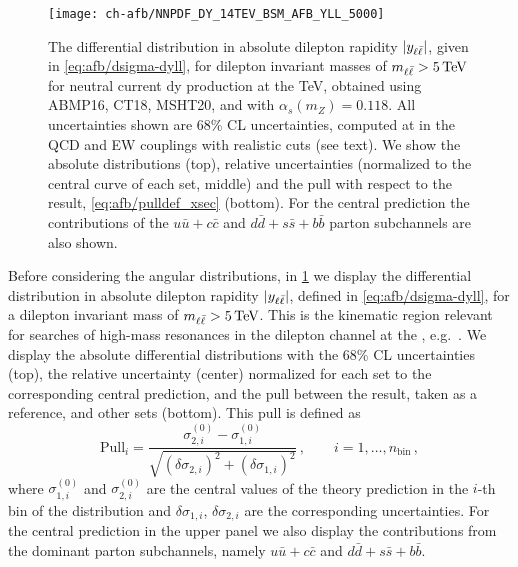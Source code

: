 \begin{figure}[!t]
 \centering
 \texttt{[image: ch-afb/NNPDF\_DY\_14TEV\_BSM\_AFB\_YLL\_5000]}
 \caption{The differential distribution in absolute dilepton rapidity $|y_{\ell\bar{\ell}}|$, given in
\cref{eq:afb/dsigma-dyll},
for dilepton invariant masses of $\mll > \SI{5}{\tera\electronvolt}$
for neutral current \acrlong{dy} production at the
 TeV,
obtained using ABMP16, CT18, MSHT20, and  \nnlo \pdfs with $\alpha_s(m_Z)=0.118$.
%
All
uncertainties shown are 68\% CL \pdf uncertainties, computed at \nlo
in the QCD and EW couplings with realistic cuts (see text).
We show the absolute distributions (top), relative uncertainties (normalized
to the central curve of each set, middle) and the pull with respect to the
 result, \cref{eq:afb/pulldef_xsec} (bottom).
%
For the central  prediction
the contributions of the $u\bar{u}+c\bar{c}$ and $d\bar{d}+s\bar{s}+b\bar{b}$
parton subchannels are also shown.
 \label{fig:afb/CMS_DY_14TEV_MLL_5000_rap}}
\end{figure}

Before considering the angular distributions, in
\cref{fig:afb/CMS_DY_14TEV_MLL_5000_rap} we display the 
differential distribution in absolute dilepton rapidity $|y_{\ell\bar{\ell}}|$,
defined in \cref{eq:afb/dsigma-dyll},
for a dilepton invariant mass of $\mll > \SI{5}{\tera\electronvolt}$.
%
This is the kinematic region relevant for searches of high-mass resonances
in the dilepton channel at the \lhc, e.g.~\cite{ATLAS:2019erb,Khachatryan:2016zqb}.
%
We display the absolute differential distributions with the 68\% CL \pdf uncertainties
(top), the relative \pdf uncertainty (center) normalized for each \pdf
set to the corresponding central prediction, and the pull between the
 result, taken as a reference, and other sets (bottom).
%
This pull is    defined as
    \begin{equation}
\label{eq:afb/pulldef_xsec}
{\text{Pull}}_i= \frac{ \sigma^{(0)}_{2,i} -\sigma^{(0)}_{1,i} }{
  \sqrt{ \left(  \delta \sigma_{2,i}\right)^2+\left(  \delta \sigma_{1,i}\right)^2 }} \, , \qquad i=1,\ldots,n_{\text{bin}} \, ,
\end{equation}
where  $\sigma^{(0)}_{1,i}$ and $\sigma^{(0)}_{2,i}$ are the central values of the
theory prediction in the $i$-th bin of the distribution and $\delta \sigma_{1,i}$, $\delta \sigma_{2,i}$ are
the corresponding \pdf uncertainties.
%
For the central  prediction in the upper panel we also display the
contributions from the dominant parton subchannels, namely
$u\bar{u}+c\bar{c}$ and $d\bar{d}+s\bar{s}+b\bar{b}$.

